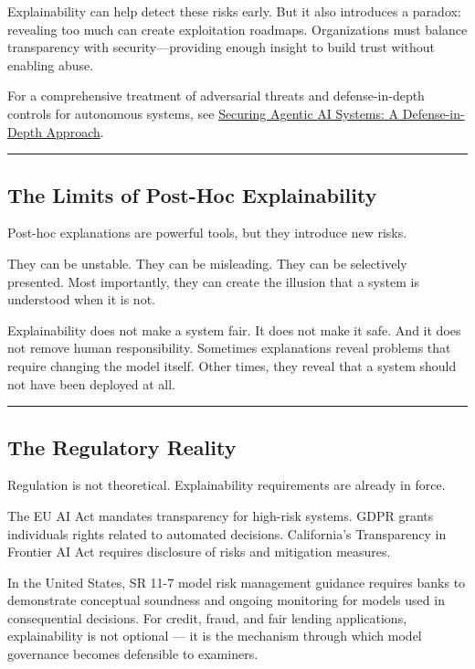 \documentclass[
  letterpaper,
  DIV=11,
  numbers=noendperiod]{scrartcl}
\begin{document}
Explainability can help detect these risks early. But it also introduces
a paradox: revealing too much can create exploitation roadmaps.
Organizations must balance transparency with security---providing enough
insight to build trust without enabling abuse.

For a comprehensive treatment of adversarial threats and
defense-in-depth controls for autonomous systems, see
\href{https://changezakram.github.io/agentic-ai/agentic_ai_security.html}{Securing
Agentic AI Systems: A Defense-in-Depth Approach}.

\begin{center}\rule{0.5\linewidth}{0.5pt}\end{center}

\subsection{The Limits of Post-Hoc
Explainability}\label{the-limits-of-post-hoc-explainability}

Post-hoc explanations are powerful tools, but they introduce new risks.

They can be unstable. They can be misleading. They can be selectively
presented. Most importantly, they can create the illusion that a system
is understood when it is not.

Explainability does not make a system fair. It does not make it safe.
And it does not remove human responsibility. Sometimes explanations
reveal problems that require changing the model itself. Other times,
they reveal that a system should not have been deployed at all.

\begin{center}\rule{0.5\linewidth}{0.5pt}\end{center}

\subsection{The Regulatory Reality}\label{the-regulatory-reality}

Regulation is not theoretical. Explainability requirements are already
in force.

The EU AI Act mandates transparency for high-risk systems. GDPR grants
individuals rights related to automated decisions. California's
Transparency in Frontier AI Act requires disclosure of risks and
mitigation measures.

In the United States, SR 11-7 model risk management guidance requires
banks to demonstrate conceptual soundness and ongoing monitoring for
models used in consequential decisions. For credit, fraud, and fair
lending applications, explainability is not optional --- it is the
mechanism through which model governance becomes defensible to
examiners.
\end{document}
